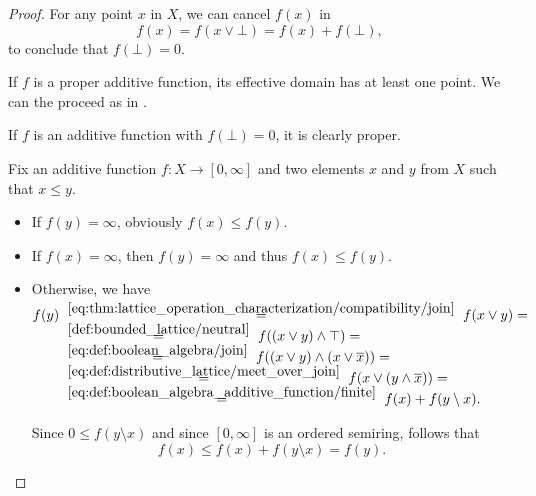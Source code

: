 \begin{proof}
   For any point \( x \) in \( X \), we can cancel \( f(x) \) in
  \begin{equation*}
    f(x) = f(x \vee \bot) = f(x) + f(\bot),
  \end{equation*}
  to conclude that \( f(\bot) = 0 \).

  \SufficiencySubProof* If \( f \) is a proper additive function, its effective domain has at least one point. We can the proceed as in .

  \NecessitySubProof* If \( f \) is an additive function with \( f(\bot) = 0 \), it is clearly proper.

   Fix an additive function \( f: X \to [0, \infty] \) and two elements \( x \) and \( y \) from \( X \) such that \( x \leq y \).

  \begin{itemize}
    \item If \( f(y) = \infty \), obviously \( f(x) \leq f(y) \).
    \item If \( f(x) = \infty \), then \( f(y) = \infty \) and thus \( f(x) \leq f(y) \).
    \item Otherwise, we have
    \begin{align*}
      f(y)
      &\reloset {\eqref{eq:thm:lattice_operation_characterization/compatibility/join}} =
      f(x \vee y)
      = \\ &\reloset {\ref{def:bounded_lattice/neutral}} =
      f((x \vee y) \wedge \top)
      = \\ &\reloset {\eqref{eq:def:boolean_algebra/join}} =
      f((x \vee y) \wedge (x \vee \oline x))
      = \\ &\reloset {\eqref{eq:def:distributive_lattice/meet_over_join}} =
      f(x \vee (y \wedge \oline x))
      = \\ &\reloset {\eqref{eq:def:boolean_algebra_additive_function/finite}} =
      f(x) + f(y \setminus x).
    \end{align*}

    Since \( 0 \leq f(y \setminus x) \) and since \( [0, \infty] \) is an ordered semiring, follows that
    \begin{equation*}
      f(x) \leq f(x) + f(y \setminus x) = f(y).
    \end{equation*}
  \end{itemize}
\end{proof}

